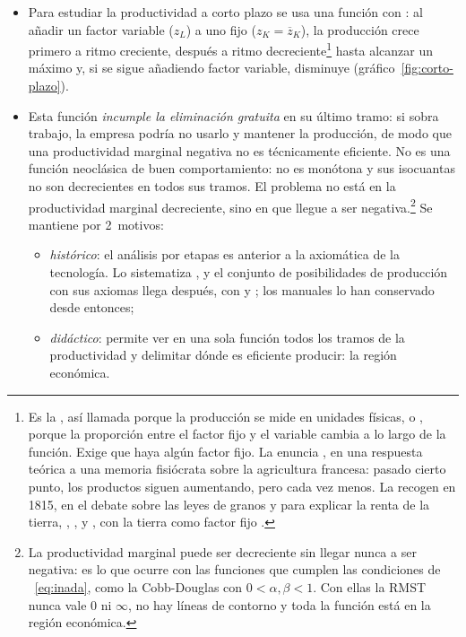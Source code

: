 \documentclass[11pt]{article}
\begin{document}
\begin{itemize}
\item Para estudiar la productividad a corto plazo se usa una función con : al añadir un factor variable ($z_L$) a uno fijo ($z_K=\overline{z}_K$), la producción crece primero a ritmo creciente, después a ritmo decreciente\footnote{Es la , así llamada porque la producción se mide en unidades físicas, o , porque la proporción entre el factor fijo y el variable cambia a lo largo de la función. Exige que haya algún factor fijo. La enuncia \textcite{Turgot1767Observations}, en una respuesta teórica a una memoria fisiócrata sobre la agricultura francesa: pasado cierto punto, los productos siguen aumentando, pero cada vez menos. La recogen en 1815, en el debate sobre las leyes de granos y para explicar la renta de la tierra, , ,  y , con la tierra como factor fijo\nocite{Humphrey1997Algebraic} .} hasta alcanzar un máximo y, si se sigue añadiendo factor variable, disminuye (gráfico~\ref{fig:corto-plazo}).
\item Esta función \emph{incumple la eliminación gratuita} en su último tramo: si sobra trabajo, la empresa podría no usarlo y mantener la producción, de modo que una productividad marginal negativa no es técnicamente eficiente. No es una función neoclásica de buen comportamiento: no es monótona y sus isocuantas no son decrecientes en todos sus tramos. El problema no está en la productividad marginal decreciente, sino en que llegue a ser negativa.\footnote{La productividad marginal puede ser decreciente sin llegar nunca a ser negativa: es lo que ocurre con las funciones que cumplen las condiciones de ~\eqref{eq:inada}, como la Cobb-Douglas con $0<\alpha,\beta<1$. Con ellas la RMST nunca vale $0$ ni $\infty$, no hay líneas de contorno y toda la función está en la región económica.} Se mantiene por 2~motivos:
  \begin{itemize}
  \item \emph{histórico}: el análisis por etapas es anterior a la axiomática de la tecnología. Lo sistematiza \textcite{Cassels1936Law}, y el conjunto de posibilidades de producción con sus axiomas llega después, con \textcite{Koopmans1951Activity} y \textcite{Debreu1959Theory}; los manuales lo han conservado desde entonces;
  \item \emph{didáctico}: permite ver en una sola función todos los tramos de la productividad y delimitar dónde es eficiente producir: la región económica.
  \end{itemize}
\end{itemize}
\end{document}
